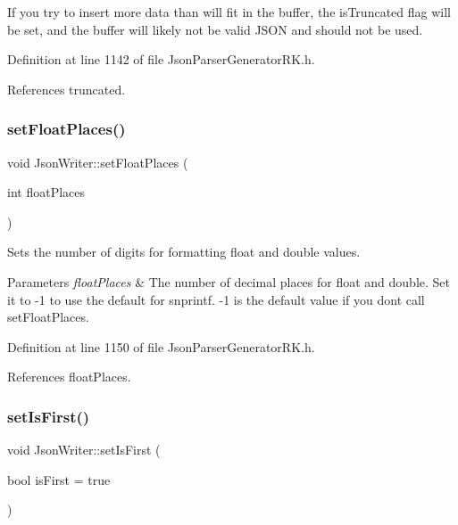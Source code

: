 If you try to insert more data than will fit in the buffer, the is\+Truncated flag will be set, and the buffer will likely not be valid J\+S\+ON and should not be used. 

Definition at line 1142 of file Json\+Parser\+Generator\+R\+K.\+h.



References truncated.

\mbox{\label{class_json_writer_aecd4d984a49fe59b0c4d892fe6d1e791}} 
\subsubsection{\texorpdfstring{set\+Float\+Places()}{setFloatPlaces()}}
{\footnotesize\ttfamily void Json\+Writer\+::set\+Float\+Places (\begin{DoxyParamCaption}\item[{int}]{float\+Places }\end{DoxyParamCaption})\hspace{0.3cm}{\ttfamily [inline]}}



Sets the number of digits for formatting float and double values. 


\begin{DoxyParams}{Parameters}
{\em float\+Places} & The number of decimal places for float and double. Set it to -\/1 to use the default for snprintf. -\/1 is the default value if you don\textquotesingle{}t call set\+Float\+Places. \\
\hline
\end{DoxyParams}


Definition at line 1150 of file Json\+Parser\+Generator\+R\+K.\+h.



References float\+Places.

\mbox{\label{class_json_writer_afc30ff673c866c7a2366a8c064b5a565}} 
\subsubsection{\texorpdfstring{set\+Is\+First()}{setIsFirst()}}
{\footnotesize\ttfamily void Json\+Writer\+::set\+Is\+First (\begin{DoxyParamCaption}\item[{bool}]{is\+First = {\ttfamily true} }\end{DoxyParamCaption})}



